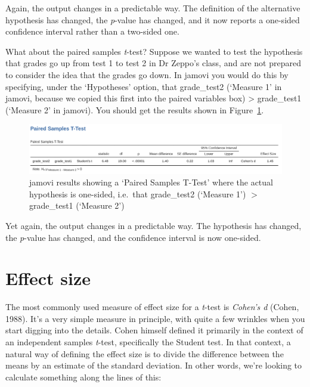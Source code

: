 \documentclass[
  a4paper,
]{book}
\begin{document}
Again, the output changes in a predictable way. The definition of the
alternative hypothesis has changed, the \emph{p}-value has changed, and
it now reports a one-sided confidence interval rather than a two-sided
one.

What about the paired samples \emph{t}-test? Suppose we wanted to test
the hypothesis that grades go up from test 1 to test 2 in Dr Zeppo's
class, and are not prepared to consider the idea that the grades go
down. In jamovi you would do this by specifying, under the `Hypotheses'
option, that grade\_test2 (`Measure 1' in jamovi, because we copied this
first into the paired variables box) \textgreater{} grade\_test1
(`Measure 2' in jamovi). You should get the results shown in
Figure~\ref{fig-fig11-19}.

\begin{figure}

\includegraphics[width=1\textwidth,height=\textheight]{images/fig11-19.png} \hfill{}

\caption{\label{fig-fig11-19}jamovi results showing a `Paired Samples
T-Test' where the actual hypothesis is one-sided, i.e.~that grade\_test2
(`Measure 1') \(>\) grade\_test1 (`Measure 2')}

\end{figure}

Yet again, the output changes in a predictable way. The hypothesis has
changed, the \emph{p}-value has changed, and the confidence interval is
now one-sided.

\hypertarget{effect-size-1}{%
\section{Effect size}\label{effect-size-1}}

The most commonly used measure of effect size for a \emph{t}-test is
\emph{Cohen's d} (Cohen, 1988). It's a very simple measure in principle,
with quite a few wrinkles when you start digging into the details. Cohen
himself defined it primarily in the context of an independent samples
\emph{t}-test, specifically the Student test. In that context, a natural
way of defining the effect size is to divide the difference between the
means by an estimate of the standard deviation. In other words, we're
looking to calculate something along the lines of this:
\end{document}
